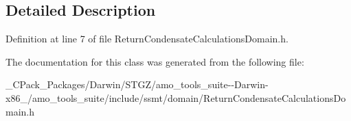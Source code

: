 \subsection{Detailed Description}


Definition at line 7 of file Return\+Condensate\+Calculations\+Domain.\+h.



The documentation for this class was generated from the following file\+:\begin{DoxyCompactItemize}
\item 
\+\_\+\+C\+Pack\+\_\+\+Packages/\+Darwin/\+S\+T\+G\+Z/amo\+\_\+tools\+\_\+suite-\/-\/\+Darwin-\/x86\+\_/amo\+\_\+tools\+\_\+suite/include/ssmt/domain/Return\+Condensate\+Calculations\+Domain.\+h\end{DoxyCompactItemize}
